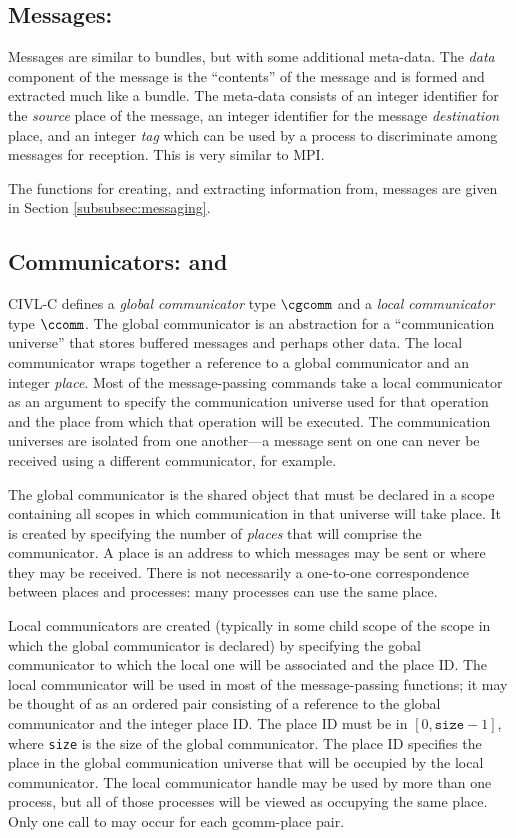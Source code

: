 \subsection{Messages: \cmessage}

Messages are similar to bundles, but with some additional meta-data.
The \emph{data} component of the message is the ``contents'' of the
message and is formed and extracted much like a bundle.  The meta-data
consists of an integer identifier for the \emph{source} place of the
message, an integer identifier for the message \emph{destination}
place, and an integer \emph{tag} which can be used by a process to
discriminate among messages for reception.  This is very similar to
MPI.

The functions for creating, and extracting information from, messages
are given in Section \ref{subsubsec:messaging}.

\subsection{Communicators: \cgcomm{} and \ccomm}
\label{sec:communicators}

CIVL-C defines a \emph{global communicator} type $\cgcomm$ and a
\emph{local communicator} type $\ccomm$. The global communicator is an
abstraction for a ``communication universe'' that stores buffered
messages and perhaps other data.  The local communicator wraps
together a reference to a global communicator and an integer
\emph{place}.  Most of the message-passing commands take a local
communicator as an argument to specify the communication universe used
for that operation and the place from which that operation will be
executed.  The communication universes are isolated from one
another---a message sent on one can never be received using a
different communicator, for example.

The global communicator is the shared object that must be declared in
a scope containing all scopes in which communication in that universe
will take place. It is created by specifying the number of
\emph{places} that will comprise the communicator. A place is an
address to which messages may be sent or where they may be received.
There is not necessarily a one-to-one correspondence between places and
processes: many processes can use the same place.

Local communicators are created (typically in some child scope of the
scope in which the global communicator is declared) by specifying the
gobal communicator to which the local one will be associated and the
place ID. The local communicator will be used in most of the
message-passing functions; it may be thought of as an ordered pair
consisting of a reference to the global communicator and the integer
place ID.  The place ID must be in $[0,\texttt{size}-1]$, where
\texttt{size} is the size of the global communicator.  The place ID
specifies the place in the global communication universe that will be
occupied by the local communicator.  The local communicator handle may
be used by more than one process, but all of those processes will be
viewed as occupying the same place.  Only one call to \ccommcreate{}
may occur for each gcomm-place pair.


